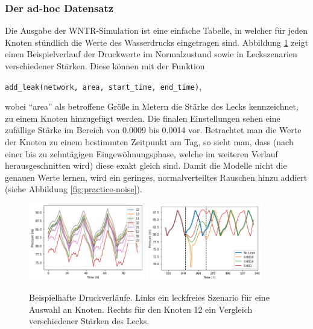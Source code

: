 \subsubsection*{Der ad-hoc Datensatz}

Die Ausgabe der WNTR-Simulation ist eine einfache Tabelle, in welcher für jeden Knoten stündlich die Werte des
 Wasserdrucks eingetragen sind. Abbildung \ref{fig:practice-sim} zeigt einen Beispielverlauf der Druckwerte im Normalzustand sowie
 in Leckszenarien verschiedener Stärken. Diese können mit der Funktion
 \begin{center}
    \texttt{add\_leak(network, area, start\_time, end\_time)},
 \end{center}
 wobei “area” als betroffene Größe in Metern die Stärke
 des Lecks kennzeichnet, zu einem Knoten hinzugefügt werden. Die finalen Einstellungen sehen eine zufällige Stärke
 im Bereich von 0.0009 bis 0.0014 vor. Betrachtet man die Werte der Knoten zu einem bestimmten Zeitpunkt am Tag,
 so sieht man, dass (nach einer bis zu zehntägigen Eingewöhnungsphase, welche im weiteren Verlauf herausgeschnitten
 wird) diese exakt gleich sind. Damit die Modelle nicht die genauen Werte lernen, wird ein geringes,
 normalverteiltes Rauschen hinzu addiert (siehe Abbildung \ref{fig:practice-noise}).

\begin{figure}[h]
    \centering
    \includegraphics[width=0.45\textwidth]{res/practice-sim-noleak.png}
    \includegraphics[width=0.45\textwidth]{res/practice-sim-leak.png}
    \caption{Beispielhafte Druckverläufe. Links ein leckfreies Szenario für eine Auswahl an Knoten. Rechts
        für den Knoten 12 ein Vergleich verschiedener Stärken des Lecks.}
    \label{fig:practice-sim}
\end{figure}

